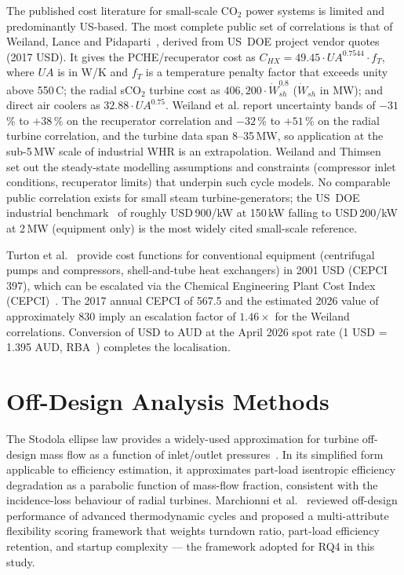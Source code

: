 The published cost literature for small-scale CO$_2$ power systems is limited
and predominantly US-based. The most complete public set of correlations is
that of Weiland, Lance and Pidaparti~\cite{Weiland2019}, derived from
US~DOE project vendor quotes (2017 USD). It gives the PCHE/recuperator cost as
$C_{HX} = 49.45 \cdot UA^{0.7544} \cdot f_T$, where $UA$ is in W/K and $f_T$
is a temperature penalty factor that exceeds unity above 550\,\textdegree C;
the radial sCO$_2$ turbine cost as $406{,}200 \cdot \dot{W}_{sh}^{0.8}$
($\dot{W}_{sh}$ in MW); and direct air coolers as $32.88 \cdot UA^{0.75}$.
Weiland et al. report uncertainty bands of $-31$\,\% to $+38$\,\% on the
recuperator correlation and $-32$\,\% to $+51$\,\% on the radial turbine
correlation, and the turbine data span 8--35\,MW, so application at the
sub-5\,MW scale of industrial WHR is an extrapolation. Weiland and
Thimsen~\cite{Weiland2016} set out the steady-state modelling assumptions and
constraints (compressor inlet conditions, recuperator limits) that underpin
such cycle models. No comparable public correlation exists for small steam
turbine-generators; the US~DOE industrial benchmark~\cite{DOE2012} of roughly
USD\,900/kW at 150\,kW falling to USD\,200/kW at 2\,MW (equipment only) is
the most widely cited small-scale reference.

Turton et al.~\cite{Turton2012} provide cost functions for conventional
equipment (centrifugal pumps and compressors, shell-and-tube heat exchangers)
in 2001 USD (CEPCI 397), which can be escalated via the Chemical Engineering
Plant Cost Index (CEPCI)~\cite{CEPCI2026}. The 2017 annual CEPCI of 567.5 and
the estimated 2026 value of approximately 830 imply an escalation factor of
$1.46\times$ for the Weiland correlations. Conversion of USD to AUD at the
April 2026 spot rate (1 USD = 1.395 AUD, RBA~\cite{RBA2026}) completes the
localisation.

\section{Off-Design Analysis Methods}
\label{sec:lit_offdesign}

The Stodola ellipse law provides a widely-used approximation for turbine
off-design mass flow as a function of inlet/outlet pressures~\cite{Marchionni2020}.
In its simplified form applicable to efficiency estimation, it approximates
part-load isentropic efficiency degradation as a parabolic function of
mass-flow fraction, consistent with the incidence-loss behaviour of radial
turbines. Marchionni et al.~\cite{Marchionni2020} reviewed off-design
performance of advanced thermodynamic cycles and proposed a multi-attribute
flexibility scoring framework that weights turndown ratio, part-load efficiency
retention, and startup complexity --- the framework adopted for RQ4 in this
study.

